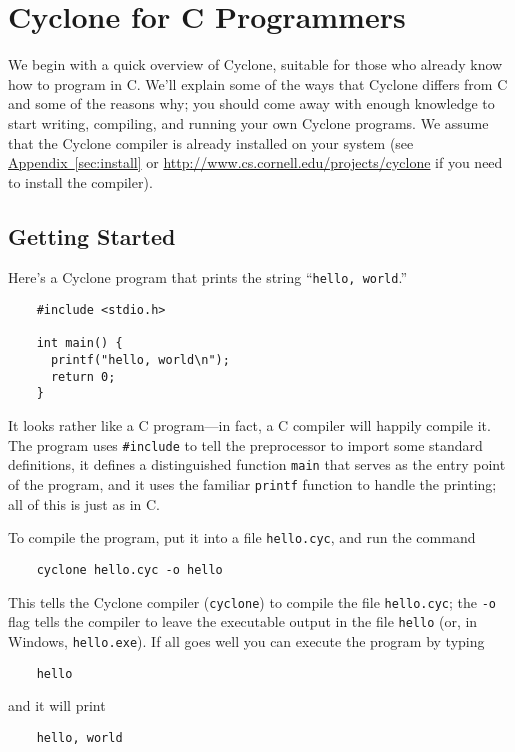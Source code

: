\section{Cyclone for C Programmers}

We begin with a quick overview of Cyclone, suitable for those who
already know how to program in C\@.  We'll explain some of the ways
that Cyclone differs from C and some of the reasons why; you should
come away with enough knowledge to start writing, compiling, and
running your own Cyclone programs.  We assume that the Cyclone
compiler is already installed on your system (see
\hyperref[{sec:install}]{Appendix~\ref{sec:install}} or \href{http://www.cs.cornell.edu/projects/cyclone}{http://www.cs.cornell.edu/projects/cyclone}
if you need to install the compiler).

\subsection{Getting Started}

Here's a Cyclone program that prints the string ``\texttt{hello,
  world}.''
\begin{verbatim}
    #include <stdio.h>

    int main() {
      printf("hello, world\n");
      return 0;
    }
\end{verbatim}

It looks rather like a C program---in fact, a C compiler will happily
compile it.  The program uses \texttt{\#include} to tell the
preprocessor to import some standard definitions, it defines a
distinguished function \texttt{main} that serves as the entry point of
the program, and it uses the familiar \texttt{printf} function to
handle the printing; all of this is just as in C\@.

To compile the program, put it into a file \texttt{hello.cyc}, and run
the command
\begin{verbatim}
    cyclone hello.cyc -o hello
\end{verbatim}
This tells the Cyclone compiler (\texttt{cyclone}) to compile the file
\texttt{hello.cyc}; the \texttt{-o} flag tells the compiler to leave
the executable output in the file \texttt{hello} (or, in Windows,
\texttt{hello.exe}).  If all goes well you can execute the program by
typing
\begin{verbatim}
    hello
\end{verbatim}
and it will print
\begin{verbatim}
    hello, world
\end{verbatim}


